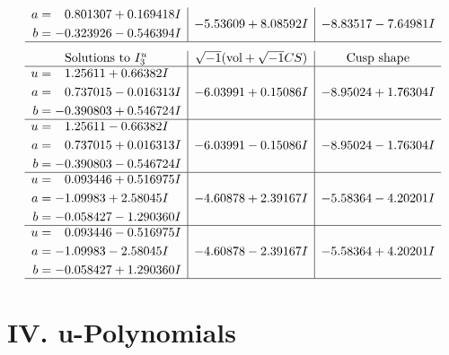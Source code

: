 \documentclass[1p]{elsarticle_modified}
\theoremstyle{definition}
\newcommand{\I}{\sqrt{-1}}
\begin{document}
$$\begin{array}{c|c|c}
\begin{aligned}
a &= \phantom{-}0.801307 + 0.169418 I \\
b &= -0.323926 - 0.546394 I\end{aligned}
 & -5.53609 + 8.08592 I & -8.83517 - 7.64981 I\\
 \hline 
 \end{array}$$\newpage$$\begin{array}{c|c|c}  
\text{Solutions to }I^u_{3}& \I (\text{vol} + \sqrt{-1}CS) & \text{Cusp shape}\\
 \hline 
\begin{aligned}
u &= \phantom{-}1.25611 + 0.66382 I \\
a &= \phantom{-}0.737015 - 0.016313 I \\
b &= -0.390803 + 0.546724 I\end{aligned}
 & -6.03991 + 0.15086 I & -8.95024 + 1.76304 I \\ \hline\begin{aligned}
u &= \phantom{-}1.25611 - 0.66382 I \\
a &= \phantom{-}0.737015 + 0.016313 I \\
b &= -0.390803 - 0.546724 I\end{aligned}
 & -6.03991 - 0.15086 I & -8.95024 - 1.76304 I \\ \hline\begin{aligned}
u &= \phantom{-}0.093446 + 0.516975 I \\
a &= -1.09983 + 2.58045 I \\
b &= -0.058427 - 1.290360 I\end{aligned}
 & -4.60878 + 2.39167 I & -5.58364 - 4.20201 I \\ \hline\begin{aligned}
u &= \phantom{-}0.093446 - 0.516975 I \\
a &= -1.09983 - 2.58045 I \\
b &= -0.058427 + 1.290360 I\end{aligned}
 & -4.60878 - 2.39167 I & -5.58364 + 4.20201 I\\
 \hline 
 \end{array}$$\newpage
\newpage\renewcommand{\arraystretch}{1}
\centering \section*{ IV. u-Polynomials}
\end{document}
